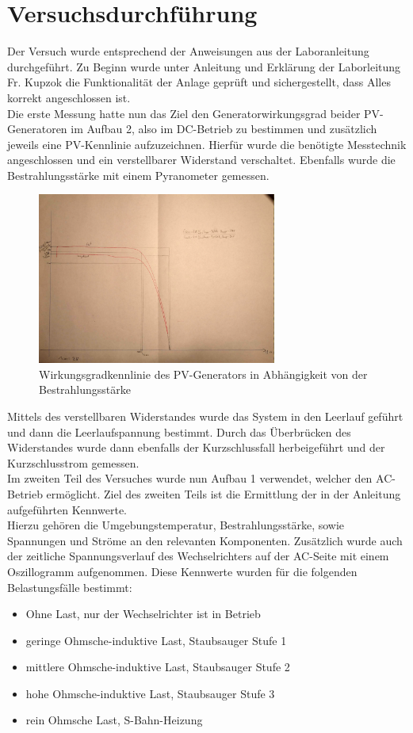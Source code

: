 \newpage
\section{Versuchsdurchführung}
Der Versuch wurde entsprechend der Anweisungen aus der Laboranleitung \cite{Laboranleitung} durchgeführt.
Zu Beginn wurde unter Anleitung und Erklärung der Laborleitung Fr. Kupzok die
Funktionalität der Anlage geprüft und sichergestellt, dass Alles korrekt angeschlossen ist.\\
Die erste Messung hatte nun das Ziel den Generatorwirkungsgrad beider PV-Generatoren im Aufbau 2, also im DC-Betrieb zu bestimmen
und zusätzlich jeweils eine PV-Kennlinie aufzuzeichnen. Hierfür wurde die benötigte Messtechnik angeschlossen und ein verstellbarer Widerstand verschaltet.
Ebenfalls wurde die Bestrahlungsstärke mit einem Pyranometer gemessen.\\
\begin{figure}[!ht]
		\centering
		\includegraphics[width=0.7\textwidth]{Abbildungen/Kennlinie_PVGEN}
		\caption{Wirkungsgradkennlinie des PV-Generators in Abhängigkeit von der Bestrahlungsstärke}
		\label{fig:230514_PVGEN_Kennlinie}
\end{figure}

Mittels des verstellbaren Widerstandes wurde das System in den Leerlauf geführt und dann die Leerlaufspannung bestimmt.
Durch das Überbrücken des Widerstandes wurde dann ebenfalls der Kurzschlussfall herbeigeführt und der Kurzschlusstrom gemessen.\\
Im zweiten Teil des Versuches wurde nun Aufbau 1 verwendet, welcher den AC-Betrieb ermöglicht.
Ziel des zweiten Teils ist die Ermittlung der in der Anleitung \cite[S.8]{Laboranleitung} aufgeführten Kennwerte.\\
Hierzu gehören die Umgebungstemperatur, Bestrahlungsstärke, sowie Spannungen und Ströme an den relevanten Komponenten.
Zusätzlich wurde auch der zeitliche Spannungsverlauf des Wechselrichters auf der AC-Seite mit einem Oszillogramm aufgenommen.
Diese Kennwerte wurden für die folgenden Belastungsfälle bestimmt:
\begin{itemize}
    \item Ohne Last, nur der Wechselrichter ist in Betrieb
    \item geringe Ohmsche-induktive Last, Staubsauger Stufe 1
    \item mittlere Ohmsche-induktive Last, Staubsauger Stufe 2
    \item hohe Ohmsche-induktive Last, Staubsauger Stufe 3
    \item rein Ohmsche Last, S-Bahn-Heizung
\end{itemize}